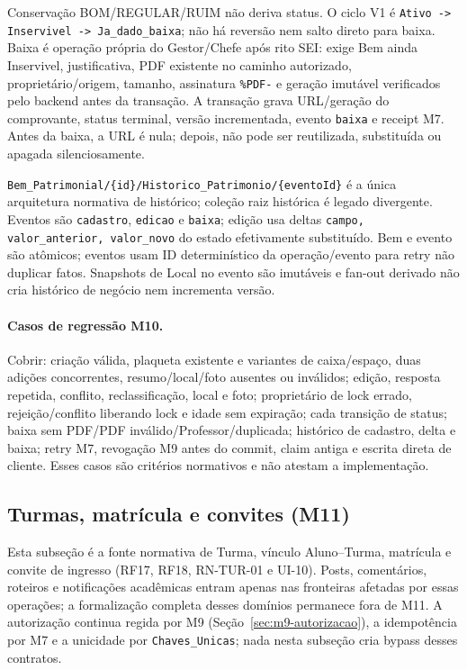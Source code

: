 \begin{regra}
Conservação BOM/REGULAR/RUIM não deriva status. O ciclo V1 é
\texttt{Ativo -> Inservivel -> Ja\_dado\_baixa}; não há reversão nem salto
direto para baixa. Baixa é operação própria do Gestor/Chefe após rito SEI: exige
Bem ainda Inservivel, justificativa, PDF existente no caminho autorizado,
proprietário/origem, tamanho, assinatura \texttt{\%PDF-} e geração imutável
verificados pelo backend antes da transação. A transação grava URL/geração do
comprovante, status terminal, versão incrementada, evento \texttt{baixa} e
receipt M7. Antes da baixa, a URL é nula; depois, não pode ser reutilizada,
substituída ou apagada silenciosamente.

\texttt{Bem\_Patrimonial/\{id\}/Historico\_Patrimonio/\{eventoId\}} é a única
arquitetura normativa de histórico; coleção raiz histórica é legado divergente.
Eventos são \texttt{cadastro}, \texttt{edicao} e \texttt{baixa}; edição usa
deltas \texttt{campo, valor\_anterior, valor\_novo} do estado efetivamente
substituído. Bem e evento são atômicos; eventos usam ID determinístico da
operação/evento para retry não duplicar fatos. Snapshots de Local no evento são
imutáveis e fan-out derivado não cria histórico de negócio nem incrementa versão.
\end{regra}

\paragraph{Casos de regressão M10.}
Cobrir: criação válida, plaqueta existente e variantes de caixa/espaço, duas
adições concorrentes, resumo/local/foto ausentes ou inválidos; edição, resposta
repetida, conflito, reclassificação, local e foto; proprietário de lock errado,
rejeição/conflito liberando lock e idade sem expiração; cada transição de status;
baixa sem PDF/PDF inválido/Professor/duplicada; histórico de cadastro, delta e
baixa; retry M7, revogação M9 antes do commit, claim antiga e escrita direta de
cliente. Esses casos são critérios normativos e não atestam a implementação.

\subsection{Turmas, matrícula e convites (M11)}
\label{sec:regras-turmas-m11}

Esta subseção é a fonte normativa de Turma, vínculo Aluno--Turma, matrícula e
convite de ingresso (RF17, RF18, RN-TUR-01 e UI-10). Posts, comentários,
roteiros e notificações acadêmicas entram apenas nas fronteiras afetadas por
essas operações; a formalização completa desses domínios permanece fora de
M11. A autorização continua regida por M9 (Seção~\ref{sec:m9-autorizacao}), a
idempotência por M7 e a unicidade por \texttt{Chaves\_Unicas}; nada nesta
subseção cria bypass desses contratos.

